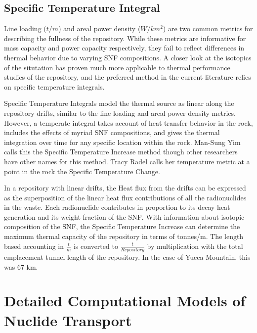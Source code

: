 \subsection{Specific Temperature Integral}

Line loading ($t/m$) and areal power density ($W/km^2$) are two common 
metrics for describing the fullness of the repository. While these 
metrics are informative for mass capacity and power capacity 
respectively, they fail to reflect differences in thermal behavior due 
to varying SNF compositions.  A closer look at the isotopics of the 
situtation has proven much more applicable to thermal performance 
studies of the repository, and the preferred method in the current 
literature relies on specific temperature integrals.


Specific Temperature Integrals model the thermal source as linear 
along the repository drifts, similar to the line loading and areal 
power density metrics. However, a temperate integral takes account of 
heat transfer behavior in the rock, includes the effects of myriad SNF 
compositions, and gives the thermal integration over time for any 
specific location within the rock.  Man-Sung Yim calls this the 
Specific Temperature Increase method\cite{li_specific_2008} though 
other researchers have other names for this method. Tracy Radel calls 
her temperature metric at a point in the rock the Specific Temperature 
Change.\cite{radel_repository_2007}

In a repository with linear drifts, the Heat flux from the drifts can 
be expressed as the superposition of the linear heat flux 
contributions of all the radionuclides in the waste. Each radionuclide 
contributes in proportion to its decay heat generation and its weight 
fraction of the SNF. With information about isotopic composition of 
the SNF, the Specific Temperature Increase can determine the maximum 
thermal capacity of the repository in terms of tonnes/m. The length 
based accounting in $\frac{t}{m}$ is converted to 
$\frac{t}{Repository}$ by multiplication with the total emplacement 
tunnel length of the repository.  In the case of Yucca Mountain, this 
was 67 km.


\section{Detailed Computational Models of Nuclide Transport}
\label{sec:detailed_nuclide}

